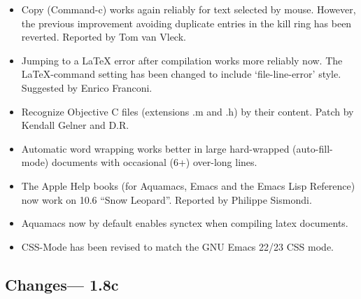 \begin{itemize}

\item Copy (Command-c) works again reliably for text selected by mouse.   However, the previous improvement avoiding duplicate entries in the kill ring has been reverted.
Reported by Tom van Vleck.

\item Jumping to a LaTeX error after compilation works more reliably now.  The LaTeX-command setting has been changed to include `file-line-error' style.
Suggested by Enrico Franconi.

\item Recognize Objective C files (extensions .m and .h) by their content.
Patch by Kendall Gelner and D.R.

\item Automatic word wrapping works better in large hard-wrapped (auto-fill-mode) documents with occasional (6+) over-long lines.

\item The Apple Help books (for Aquamacs, Emacs and the Emacs Lisp Reference) now work on 10.6 ``Snow Leopard''.
Reported by Philippe Sismondi.

\item Aquamacs now by default enables synctex when compiling latex documents.

\item CSS-Mode has been revised to match the GNU Emacs 22/23 CSS mode.

\end{itemize}

\subsection{Changes--- 1.8c}

